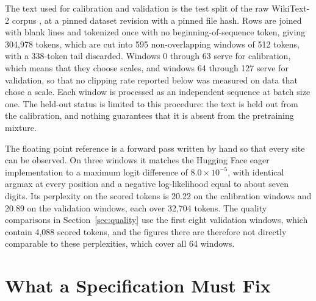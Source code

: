 \documentclass[11pt]{article}
\begin{document}
The text used for calibration and validation is the test split of the raw WikiText-2 corpus \cite{merity2017}, at a pinned dataset revision with a pinned file hash. Rows are joined with blank lines and tokenized once with no beginning-of-sequence token, giving 304,978 tokens, which are cut into 595 non-overlapping windows of 512 tokens, with a 338-token tail discarded. Windows 0 through 63 serve for calibration, which means that they choose scales, and windows 64 through 127 serve for validation, so that no clipping rate reported below was measured on data that chose a scale. Each window is processed as an independent sequence at batch size one. The held-out status is limited to this procedure: the text is held out from the calibration, and nothing guarantees that it is absent from the pretraining mixture.

The floating point reference is a forward pass written by hand so that every site can be observed. On three windows it matches the Hugging Face eager implementation to a maximum logit difference of $8.0\times10^{-5}$, with identical argmax at every position and a negative log-likelihood equal to about seven digits. Its perplexity on the scored tokens is 20.22 on the calibration windows and 20.89 on the validation windows, each over 32,704 tokens. The quality comparisons in Section~\ref{sec:quality} use the first eight validation windows, which contain 4,088 scored tokens, and the figures there are therefore not directly comparable to these perplexities, which cover all 64 windows.

\section{What a Specification Must Fix}
\label{sec:spec}
\end{document}
